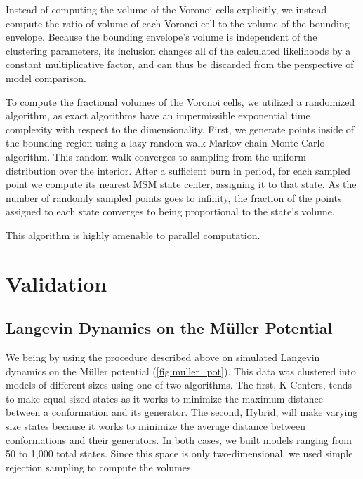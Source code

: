 \documentclass[twocolumn,floatfix,nofootinbib,aps]{revtex4-1}
\begin{document}
Instead of computing the volume of the Voronoi cells explicitly, we instead
compute the ratio of volume of each Voronoi cell to the volume of the
bounding envelope. Because the bounding envelope's volume is independent of the clustering parameters, its inclusion changes all of the calculated likelihoods by a constant multiplicative factor, and can thus be discarded from the perspective of model comparison.

To compute the fractional volumes of the Voronoi cells, we utilized a randomized algorithm, as exact algorithms have an impermissible exponential time complexity with respect to the dimensionality. First, we generate points inside of the bounding region using a lazy random walk Markov chain Monte Carlo algorithm.\cite{Kannan97} This random walk converges to sampling from the uniform distribution over the interior. After a sufficient burn in period, for each sampled point we compute its nearest MSM state center, assigning it to that state. As the number of randomly sampled points goes to infinity, the fraction of the points assigned to each state converges to being proportional to the state's volume.

This algorithm is highly amenable to parallel computation.

\section{Validation}

\subsection{Langevin Dynamics on the M\"uller Potential}
We being by using the procedure described above on simulated Langevin dynamics on the M\"{u}ller potential (\cref{fig:muller_pot}). This data was clustered into models of different sizes using one of two algorithms. The first, K-Centers, tends to make equal sized states as it works to minimize the maximum distance between a conformation and its generator. The second, Hybrid, will make varying size states because it works to minimize the average distance between conformations and their generators. In both cases, we built models ranging from 50 to 1,000 total states. Since this space is only two-dimensional, we used simple rejection sampling to compute the volumes. 
\end{document}
